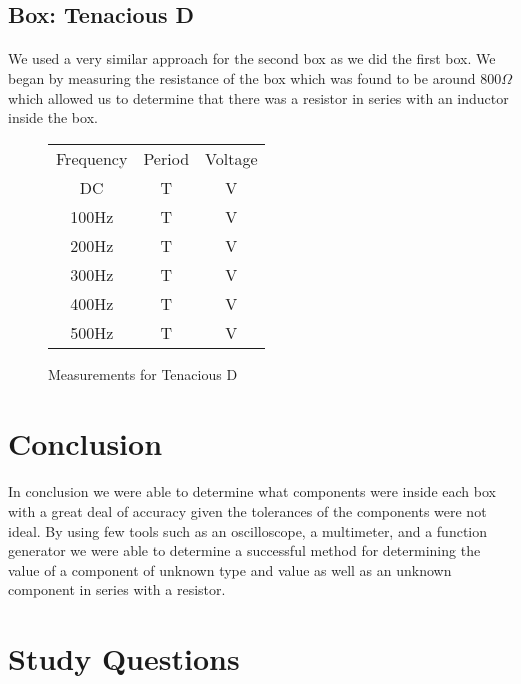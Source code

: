 \documentclass{article}
\begin{document}
\subsection*{Box: Tenacious D}
\paragraph{}
We used a very similar approach for the second box as we did the first box. We
began by measuring the resistance of the box which was found to be around
$800\Omega$ which allowed us to determine that there was a resistor in series
with an inductor inside the box.



\begin{figure}[!h]
\caption{Measurements for Tenacious D}
\begin{center}
\begin{tabular}{|c|c|c|}
\hline
Frequency & Period & Voltage\\
DC & T & V\\
\hline
100Hz & T & V\\
\hline
200Hz & T & V\\
\hline
300Hz & T & V\\
\hline
400Hz & T & V\\
\hline
500Hz & T & V\\
\hline
\end{tabular}
\end{center}
\end{figure}



\section*{Conclusion}
\paragraph{}
In conclusion we were able to determine what components were inside each box with
a great deal of accuracy given the tolerances of the components were not ideal. By
using few tools such as an oscilloscope, a multimeter, and a function generator we
were able to determine a successful method for determining the value of a component
of unknown type and value as well as an unknown component in series with a resistor.

\section*{Study Questions}
\end{document}
